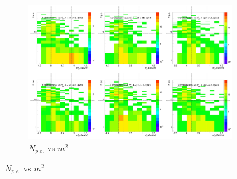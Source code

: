 \begin{figure}[H]
  \centering
    \begin{subfigure}{1\textwidth}
    \includegraphics[width=1\textwidth]{hiptfits/neg/PSaccthreshold_cent0_ich0_accfire0_ptbin14.jpg}
    \caption{$N_{p.e.}$ vs $m^2$}
    \end{subfigure}
\end{figure}
